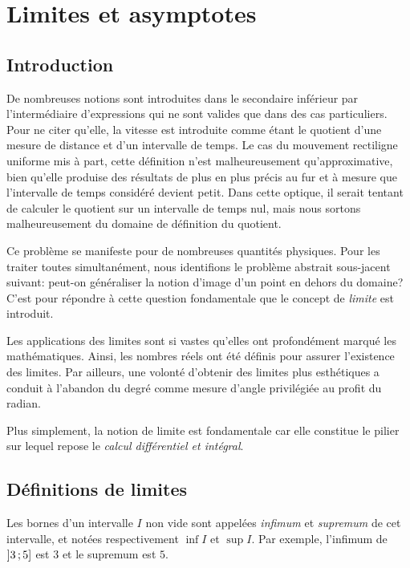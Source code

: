 \documentclass[main.tex]{subfiles}
\begin{document}
\chapter{Limites et asymptotes}

\section{Introduction}

De nombreuses notions sont introduites dans le secondaire inférieur par l'intermédiaire d'expressions
qui ne sont valides que dans des cas particuliers.
Pour ne citer qu'elle,
la vitesse est introduite comme étant le quotient d'une mesure de distance et d'un intervalle de temps.
Le cas du mouvement rectiligne uniforme mis à part,
cette définition n'est malheureusement qu'approximative,
bien qu'elle produise des résultats de plus en plus précis
au fur et à mesure que l'intervalle de temps considéré devient petit.
Dans cette optique,
il serait tentant de calculer le quotient sur un intervalle de temps nul,
mais nous sortons malheureusement du domaine de définition du quotient.

Ce problème se manifeste pour de nombreuses quantités physiques.
Pour les traiter toutes simultanément,
nous identifions le problème abstrait sous-jacent suivant:
peut-on généraliser la notion d'image d'un point en dehors du domaine?
C'est pour répondre à cette question fondamentale que le concept de \emph{limite} est introduit.

Les applications des limites sont si vastes
qu'elles ont profondément marqué les mathématiques.
Ainsi, les nombres réels ont été définis pour assurer l'existence des limites.
Par ailleurs,
une volonté d'obtenir des limites plus esthétiques a conduit à l'abandon du degré comme mesure d'angle privilégiée au profit du radian.

Plus simplement,
la notion de limite est fondamentale
car elle constitue le pilier sur lequel repose le \emph{calcul différentiel et intégral}.

\section{Définitions de limites}

Les bornes d'un intervalle $I$ non vide sont appelées \emph{infimum} et \emph{supremum} de cet intervalle,
et notées respectivement $\inf I$ et $\sup I$.
Par exemple, l'infimum de $\mathopen{]}3\,;5\mathclose{]}$ est $3$ et le supremum est $5$.
\end{document}
